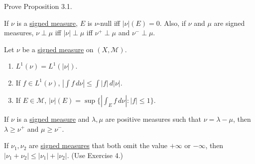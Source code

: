 	\begin{exercise}[Folland 3.1]
		Prove Proposition 3.1.
	\end{exercise}
	\begin{solution}

	\end{solution}

	\begin{exercise}[Folland 3.2]
		If $\nu$ is a \hyperref[def:signed-measure]{signed measure}, $E$ is $\nu$-null iff $|\nu|(E) = 0$. Also, if $\nu$ and $\mu$ are signed measures, $\nu \perp \mu$ iff $|\nu| \perp \mu$ iff $\nu^+ \perp \mu$ and $\nu^- \perp \mu$.
	\end{exercise}
	\begin{solution}

	\end{solution}

	\begin{exercise}[Folland 3.3]
		Let $\nu$ be a \hyperref[def:signed-measure]{signed measure} on $(X, \mathcal{M})$.
		\begin{enumerate}[label=\textbf{\alph*.}]
			\item $L^1(\nu) = L^1(|\nu|)$.
			\item If $f \in L^1(\nu)$, $|\int f \, d\nu| \le \int |f| \, d|\nu|$.
			\item If $E \in \mathcal{M}$, $|\nu|(E) = \sup\{|\int_E f \, d\nu| : |f| \le 1\}$.
		\end{enumerate}
	\end{exercise}
	\begin{solution}

	\end{solution}

	\begin{exercise}[Folland 3.4]
		If $\nu$ is a \hyperref[def:signed-measure]{signed measure} and $\lambda, \mu$ are positive measures such that $\nu = \lambda - \mu$, then $\lambda \ge \nu^+$ and $\mu \ge \nu^-$.
	\end{exercise}
	\begin{solution}

	\end{solution}

	\begin{exercise}[Folland 3.5]
		If $\nu_1, \nu_2$ are \hyperref[def:signed-measure]{signed measures} that both omit the value $+\infty$ or $-\infty$, then $|\nu_1 + \nu_2| \le |\nu_1| + |\nu_2|$. (Use Exercise 4.)
	\end{exercise}
	\begin{solution}

	\end{solution}

